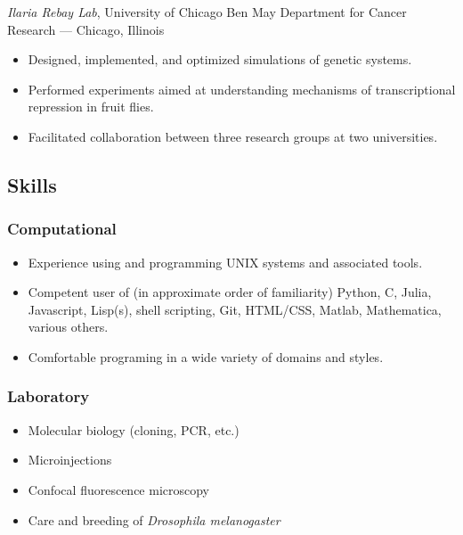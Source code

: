 \documentclass[]{article}
\begin{document}
\begin{itemize}
  \emph{Ilaria Rebay Lab}, University of Chicago Ben May Department for
  Cancer Research --- Chicago, Illinois

  \begin{itemize}
  \itemsep1pt\parskip0pt
  \item
    Designed, implemented, and optimized simulations of genetic systems.
  \item
    Performed experiments aimed at understanding mechanisms of
    transcriptional repression in fruit flies.
  \item
    Facilitated collaboration between three research groups at two
    universities.
  \end{itemize}
\end{itemize}

\subsection{Skills}\label{skills}

\subsubsection{Computational}\label{computational}

\begin{itemize}
\itemsep1pt\parskip0pt
\item
  Experience using and programming UNIX systems and associated tools.
\item
  Competent user of (in approximate order of familiarity) Python, C,
  Julia, Javascript, Lisp(s), shell scripting, Git, HTML/CSS, Matlab,
  Mathematica, various others.
\item
  Comfortable programing in a wide variety of domains and styles.
\end{itemize}

\subsubsection{Laboratory}\label{laboratory}

\begin{itemize}
\itemsep1pt\parskip0pt
\item
  Molecular biology (cloning, PCR, etc.)
\item
  Microinjections
\item
  Confocal fluorescence microscopy
\item
  Care and breeding of \emph{Drosophila melanogaster}
\end{itemize}
\end{document}
